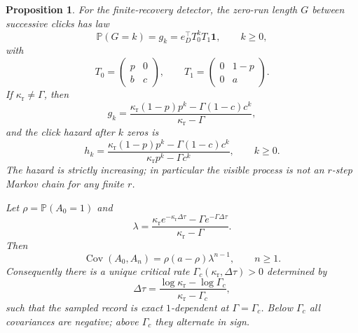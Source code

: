 \documentclass[11pt]{amsart}
\numberwithin{equation}{section}
\newtheorem{proposition}[theorem]{Proposition}
\theoremstyle{remark}
\newcommand{\PP}{\mathbb{P}}
\begin{document}
\begin{proposition}\label{prop:recovery-main}
For the finite-recovery detector, the zero-run length $G$ between successive clicks has law
\begin{equation}\label{eq:gap-main}
\PP(G=k)=g_k=e_D^{\top}T_0^kT_1\mathbf 1,
\qquad k\ge0,
\end{equation}
with
\begin{equation}\label{eq:t0-t1-main}
T_0=
\begin{pmatrix}
 p & 0 \\
 b & c
\end{pmatrix},
\qquad
T_1=
\begin{pmatrix}
 0 & 1-p \\
 0 & a
\end{pmatrix}.
\end{equation}
If $\kappa_{\mathrm r}\neq\Gamma$, then
\begin{equation}\label{eq:gap-closed-main}
g_k=
\frac{\kappa_{\mathrm r}(1-p)p^k-\Gamma(1-c)c^k}{\kappa_{\mathrm r}-\Gamma},
\end{equation}
and the click hazard after $k$ zeros is
\begin{equation}\label{eq:hazard-main}
h_k=
\frac{\kappa_{\mathrm r}(1-p)p^k-\Gamma(1-c)c^k}
     {\kappa_{\mathrm r}p^k-\Gamma c^k},
\qquad k\ge0.
\end{equation}
The hazard is strictly increasing; in particular the visible process is not an $r$-step Markov chain for any finite $r$.

Let $\rho=\PP(A_0=1)$ and
\begin{equation}\label{eq:lambda-main}
\lambda=
\frac{\kappa_{\mathrm r}e^{-\kappa_{\mathrm r}\Delta\tau}-\Gamma e^{-\Gamma\Delta\tau}}
{\kappa_{\mathrm r}-\Gamma}.
\end{equation}
Then
\begin{equation}\label{eq:cov-main}
\operatorname{Cov}(A_0,A_n)=\rho(a-\rho)\lambda^{n-1},\qquad n\ge1.
\end{equation}
Consequently there is a unique critical rate $\Gamma_c(\kappa_{\mathrm r},\Delta\tau)>0$ determined by
\begin{equation}\label{eq:gamma-c-main}
\Delta\tau=
\frac{\log\kappa_{\mathrm r}-\log\Gamma_c}{\kappa_{\mathrm r}-\Gamma_c},
\end{equation}
such that the sampled record is exact $1$-dependent at $\Gamma=\Gamma_c$. Below $\Gamma_c$ all covariances are negative; above $\Gamma_c$ they alternate in sign.
\end{proposition}
\end{document}

